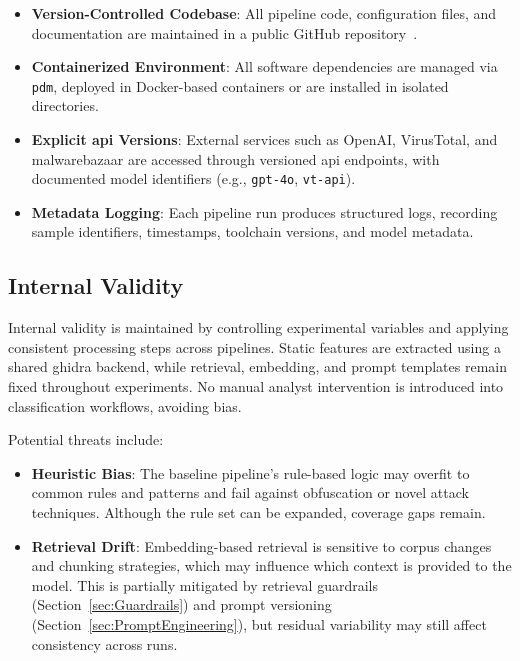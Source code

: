 \begin{itemize}
      \item \textbf{Version-Controlled Codebase}: All pipeline code, configuration files,
            and documentation are maintained in a public GitHub repository~\cite{rexisRepo}.

      \item \textbf{Containerized Environment}: All software dependencies are managed via
            \texttt{\gls{pdm}}, deployed in Docker-based containers or are installed in isolated directories.

      \item \textbf{Explicit \gls{api} Versions}: External services such as OpenAI, VirusTotal, and
            \gls{malwarebazaar} are accessed through versioned \gls{api} endpoints, with documented model
            identifiers (e.g., \texttt{gpt-4o}, \texttt{vt-\gls{api}}).

      \item \textbf{Metadata Logging}: Each pipeline run produces structured logs, recording
            sample identifiers, timestamps, toolchain versions, and model metadata.
\end{itemize}

\subsection{Internal Validity}\label{subsec:InternalValidity}
Internal validity is maintained by controlling experimental variables and applying consistent
processing steps across pipelines. Static features are extracted using a shared \gls{ghidra}
backend, while retrieval, embedding, and prompt templates remain fixed throughout experiments. No
manual analyst intervention is introduced into classification workflows, avoiding bias.

Potential threats include:
\begin{itemize}
      \item \textbf{Heuristic Bias}: The baseline pipeline’s rule-based logic may overfit
            to common rules and patterns and fail against obfuscation or novel attack techniques.
            Although the rule set can be expanded, coverage gaps remain.
      \item \textbf{Retrieval Drift}: Embedding-based retrieval is sensitive to corpus changes
            and chunking strategies, which may influence which context is provided to the model.
            This is partially mitigated by retrieval guardrails (Section~\ref{sec:Guardrails})
            and prompt versioning (Section~\ref{sec:PromptEngineering}), but residual variability
            may still affect consistency across runs.
\end{itemize}

